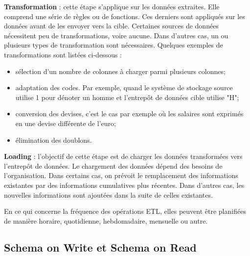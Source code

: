 		\textbf{Transformation} : cette étape  s'applique  sur les données extraites. Elle comprend  une série de règles ou de fonctions. Ces derniers sont appliqués sur les données avant de les envoyer vers la cible. Certaines sources de données nécessitent  peu de transformations, voire aucune. Dans d'autres cas, un ou plusieurs  types de transformation sont  nécessaires. Quelques exemples de transformations  sont    listées ci-dessous :
		\begin{itemize}
			\item sélection d'un nombre  de colonnes à charger parmi plusieurs colonnes;
			\item adaptation des codes. Par exemple,  quand le système de stockage source utilise 1 pour dénoter un homme et l'entrepôt de données cible  utilise "H"; 
			\item conversion des devises, c'est le cas par exemple où les salaires sont exprimés en une devise différente de l'euro;
			\item élimination des doublons.
		\end{itemize}
		
		\textbf{Loading} : l'objectif de cette étape est de charger les données transformées vers l'entrepôt de données. Le chargement des données dépend des besoins de l'organisation. Dans certains cas, on prévoit le remplacement des informations existantes par des informations cumulatives plus récentes. Dans d'autres cas, les nouvelles informations sont ajoutées dans la suite de celles existantes. 
		
		En ce qui concerne la fréquence  des opérations ETL, elles peuvent être planifiées de manière horaire, quotidienne, hebdomadaire, mensuelle ou autre.
		
		 
		
		
		
		\subsection{Schema on Write et Schema on Read} \label{sec:schema-read-write}
		
